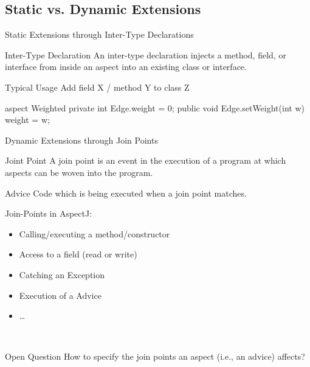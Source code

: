 \subsection{Static vs. Dynamic Extensions}

\begin{frame}[fragile]{Static Extensions through Inter-Type Declarations}
	\begin{mycolumns}[widths={50,50},animation=none]
		\begin{definition}{Inter-Type Declaration }
			An inter-type declaration injects a method, field, or interface from inside an aspect into an existing class or interface.
		\end{definition}
		\begin{note}{Typical Usage}
			Add field X / method Y to class Z
		\end{note}
	\mynextcolumn
\begin{codetight}{}
aspect Weighted {
	private int Edge.weight = 0;
	public void Edge.setWeight(int w) {
		weight = w;
	}
}
\end{codetight}
	\end{mycolumns}
\end{frame}

\begin{frame}{Dynamic Extensions through Join Points}
	\begin{mycolumns}[widths={50,50},animation=none]
		\begin{definition}{Joint Point }
			A join point is an event in the execution of a program at which aspects can be woven into the program.
		\end{definition}
		\begin{definition}{Advice}
			Code which is being executed when a join point matches. 
		\end{definition}
		\begin{definition}{Join-Points in AspectJ:}
			\begin{itemize}
				\item Calling/executing a method/constructor
				\item Access to a field (read or write)
				\item Catching an Exception
				\item Execution of a Advice
				\item \ldots
			\end{itemize}
		\end{definition}
	\mynextcolumn
		\begin{exampletight}{}
			\centering
		\end{exampletight}
		
		~
		
		\pause
		\begin{note}{Open Question}		
			How to specify the join points an aspect (i.e., an advice) affects?
		\end{note}
	\end{mycolumns}
\end{frame}

